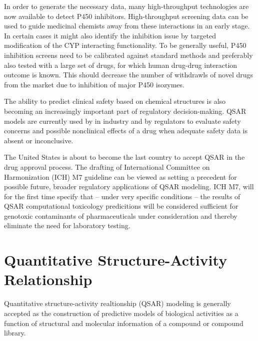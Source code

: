 

In order to generate the necessary data, many high-throughput technologies are now available to detect P450 inhibitors. High-throughput screening data can be used to guide medicinal chemists away from these interactions in an early stage. In certain cases it might also identify the inhibition issue by targeted modification of the CYP interacting functionality. To be generally useful, P450 inhibition screens need to be calibrated against standard methods and preferably also tested with a large set of drugs, for which human drug-drug interaction outcome is known. \cite{Zlokarnik2005} This should decrease the number of withdrawls of novel drugs from the market due to inhibition of major P450 isozymes.

The ability to predict clinical safety based on chemical structures is also becoming an increasingly important part of regulatory decision-making. QSAR models are currently used by in industry and by regulators to evaluate safety concerns and possible nonclinical effects of a drug when adequate safety data is absent or inconclusive.\cite{Kruhlak2012}

The United States is about to become the last country to accept QSAR in the drug approval process. The drafting of International Committee on Harmonization (ICH) M7 guideline can be viewed as setting a precedent for possible future, broader regulatory applications of QSAR modeling. ICH M7, will for the first time specify that -- under very specific conditions -- the results of QSAR computational toxicology predicitions will be considered sufficient for genotoxic contaminants of pharmaceuticals under consideration and thereby eliminate the need for laboratory testing. \cite{Kruhlak2012}


\section{Quantitative Structure-Activity Relationship}

Quantitative structure-activity realtionship (QSAR) modeling is generally accepted as the construction of predictive models of biological activities as a function of structural and molecular information of a compound or compound library. \cite{Nantasenamat2009}

